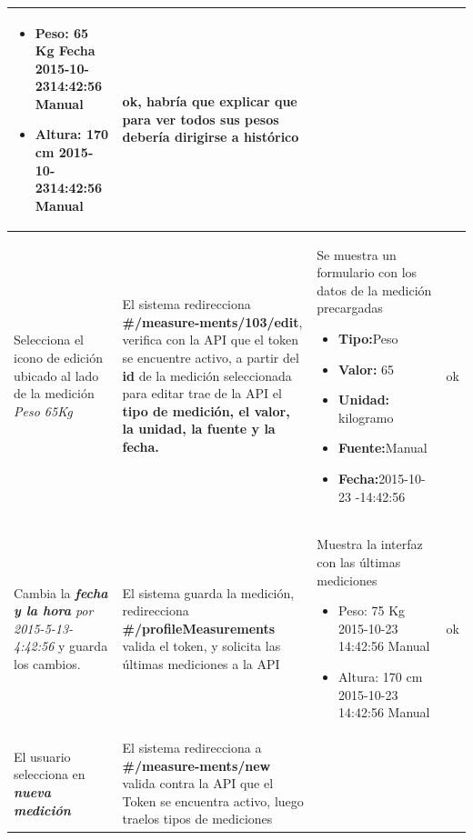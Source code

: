 \documentclass[a4paper,12pt]{article}
\begin{document}
\begin{longtable}{|p{4cm}|p{4cm}|p{4cm}|p{3cm}|}
\begin{itemize}
	\item Peso: 65 Kg Fecha 2015-10-2314:42:56 Manual
	\item Altura: 170 cm 2015-10-2314:42:56 Manual

\end{itemize}
& ok, habría que explicar que para ver todos sus pesos debería dirigirse a histórico

\\ \hline






Selecciona el icono de edición ubicado al lado de la medición \textit{Peso 65Kg}
& El sistema redirecciona \textbf{\#/measure-ments/103/edit}, verifica con la API que el token se encuentre activo, a partir del\textbf{ id} de la medición seleccionada para editar trae de la API el \textbf{tipo de medición, el valor, la unidad, la fuente y la fecha.}

& Se muestra un formulario con los datos de la medición precargadas
\begin{itemize}
	\item \textbf{Tipo:}Peso 
	\item \textbf{Valor: }65 
	\item \textbf{Unidad:} kilogramo
	\item \textbf{Fuente:}Manual 
	\item \textbf{Fecha:}2015-10-23 -14:42:56
\end{itemize}
&  ok
\\ \hline





Cambia la \textit{\textbf{fecha y la hora} por 2015-5-13- 4:42:56 }y guarda los cambios.
& El sistema guarda la medición, redirecciona\textbf{ \#/profileMeasurements }valida el token, y solicita las últimas mediciones a la API

& Muestra la interfaz con las últimas mediciones 
\begin{itemize}
	\item Peso: 75 Kg 2015-10-23 14:42:56 Manual 
	\item Altura: 170 cm 2015-10-23 14:42:56 Manual
\end{itemize}
& ok
\\ \hline





El usuario selecciona en \textit{\textbf{nueva medición}}
& El sistema redirecciona a \textbf{\#/measure-ments/new} valida contra la API que el Token se encuentra activo, luego traelos tipos de mediciones


\end{longtable}
\end{document}
